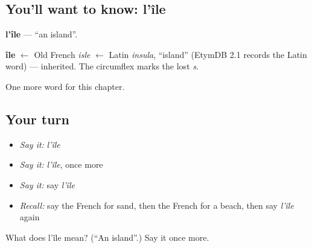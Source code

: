 \subsection*{You'll want to know: l'île}
\textbf{l'île} — \textquotedblleft{}an island\textquotedblright{}.

\begin{cousinweb}
\textbf{île} $\leftarrow$ Old French \emph{isle} $\leftarrow$ Latin \emph{insula}, \textquotedblleft{}island\textquotedblright{} (EtymDB 2.1 records the Latin word) — inherited. The circumflex marks the lost \emph{s}.
\end{cousinweb}

\begin{grammarlens}[title={What you've built}]
One more word for this chapter.
\end{grammarlens}

\subsection*{Your turn}
\begin{itemize}
\raggedright
  \item \emph{Say it:} \emph{l'île}
  \item \emph{Say it:} \emph{l'île}, once more
  \item \emph{Say it:} say \emph{l'île}
  \item \emph{Recall:} say the French for sand, then the French for a beach, then say \emph{l'île} again
\end{itemize}

\begin{tcolorbox}[breakable,colback=teal!4,colframe=teal!35!black,title={Before you move on}]
What does l'île mean? (\textquotedblleft{}An island\textquotedblright{}.) Say it once more.
\end{tcolorbox}
